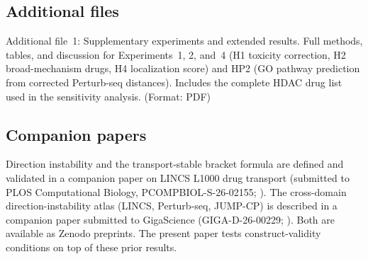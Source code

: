 \documentclass[11pt]{article}
\begin{document}
\subsection*{Additional files}
Additional file~1: Supplementary experiments and extended results.
Full methods, tables, and discussion for Experiments~1, 2, and~4
(H1 toxicity correction, H2 broad-mechanism drugs, H4 localization
score) and HP2 (GO pathway prediction from corrected Perturb-seq
distances). Includes the complete HDAC drug list used in the
sensitivity analysis. (Format: PDF)

\subsection*{Companion papers}
Direction instability and the transport-stable bracket formula are
defined and validated in a companion paper on LINCS L1000 drug
transport (submitted to PLOS Computational Biology,
PCOMPBIOL-S-26-02155; \citep{tower2026drug}). The cross-domain
direction-instability atlas (LINCS, Perturb-seq, JUMP-CP) is
described in a companion paper submitted to GigaScience
(GIGA-D-26-00229; \citep{tower2026atlas}). Both are available as
Zenodo preprints. The present paper tests construct-validity
conditions on top of these prior results.



\end{document}
